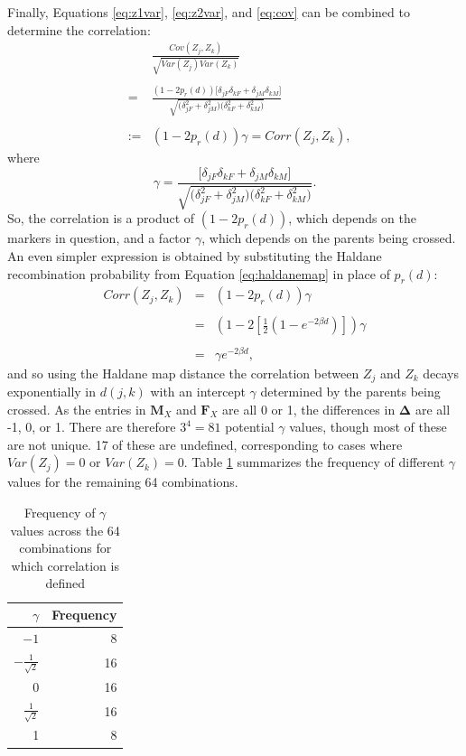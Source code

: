 \documentclass[sts]{imsart}
\newcommand{\m}[1]{\mathbf{#1}}               %
\newcommand{\sm}[1]{\boldsymbol{#1}}   %
\begin{document}
Finally, Equations \ref{eq:z1var}, \ref{eq:z2var}, and \ref{eq:cov} can be combined to determine the correlation:
\begin{eqnarray} \label{eq:precorr}
    & & \frac{Cov(Z_j, Z_k)}{\sqrt{Var(Z_j) Var(Z_k)}} \nonumber\\
    & & \nonumber\\
    & = & \frac{ (1 - 2 p_r(d)) \Big [ \delta_{jF} \delta_{kF} + \delta_{jM} \delta_{kM} \Big ] }{  \sqrt{ \big ( \delta_{jF}^2 + \delta_{jM}^2 \big ) \big ( \delta_{kF}^2 + \delta_{kM}^2 \big )}} \nonumber\\
    & & \nonumber \\
    & := & (1 - 2 p_r(d)) \gamma = Corr(Z_j, Z_k),
\end{eqnarray}
where
\begin{equation} \label{eq:gammaDef}
\gamma = \frac{ \Big [ \delta_{jF} \delta_{kF} + \delta_{jM} \delta_{kM} \Big ] }{  \sqrt{ \big ( \delta_{jF}^2 + \delta_{jM}^2 \big ) \big ( \delta_{kF}^2 + \delta_{kM}^2 \big )}}.
\end{equation}
So, the correlation is a product of $(1-2 p_r(d))$, which depends on the markers in question, and a factor $\gamma$, which depends on the parents being crossed. An even simpler expression is obtained by substituting the Haldane recombination probability from Equation \ref{eq:haldanemap} in place of $p_r(d)$:
\begin{eqnarray} \label{eq:corrdist}
    Corr(Z_j, Z_k) & = & (1 - 2 p_r(d)) \gamma \nonumber\\
    & & \nonumber\\
    & = & \left ( 1 - 2 \left [ \frac{1}{2} \left ( 1 - e^{-2 \beta d} \right ) \right ] \right ) \gamma \nonumber\\
    & & \nonumber\\
    & = & \gamma e^{-2 \beta d},
\end{eqnarray}
and so using the Haldane map distance the correlation between $Z_j$ and $Z_k$ decays exponentially in $d(j,k)$ with an intercept $\gamma$ determined by the parents being crossed. As the entries in $\m{M}_X$ and $\m{F}_X$ are all 0 or 1, the differences in $\sm{\Delta}$ are all -1, 0, or 1. There are therefore $3^4 = 81$ potential $\gamma$ values, though most of these are not unique. 17 of these are undefined, corresponding to cases where $Var(Z_j) = 0$ or $Var(Z_k) = 0$. Table \ref{tab:gammaSum} summarizes the frequency of different $\gamma$ values for the remaining 64 combinations.
\begin{table}[!h]
  \begin{tabular}{rr} \hline
    $\gamma$ & Frequency \\ \hline
    $-1$ & 8 \\
    $-\frac{1}{\sqrt{2}}$ & 16 \\
    0 & 16 \\
    $\frac{1}{\sqrt{2}}$ & 16 \\
    1 & 8 \\ \hline
  \end{tabular}
  \caption{Frequency of $\gamma$ values across the 64 combinations for which correlation is defined} \label{tab:gammaSum}
\end{table}
\end{document}

